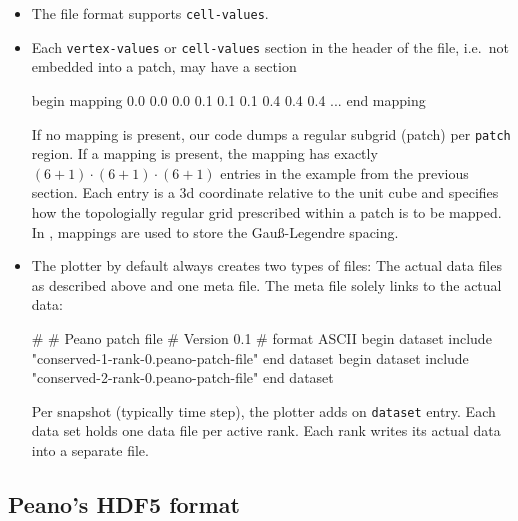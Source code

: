 \begin{itemize}
  \item The file format supports \texttt{cell-values}.
  \item Each \texttt{vertex-values} or \texttt{cell-values} section in the
  header of the file, i.e.~not embedded into a patch, may have a section
  \begin{code}
   begin mapping
     0.0 0.0 0.0
     0.1 0.1 0.1
     0.4 0.4 0.4
     ...
   end mapping
  \end{code} 
  If no mapping is present, our code dumps a regular subgrid (patch) per
  \texttt{patch} region. If a mapping is present, the mapping has exactly $(6+1)
  \cdot (6+1) \cdot (6+1)$ entries in the example from the previous section.
  Each entry is a 3d coordinate relative to the unit cube and specifies how the
  topologially regular grid prescribed within a patch is to be mapped. In
  \exahype, mappings are used to store the Gau\ss -Legendre spacing.
  \item The plotter by default always creates two types of files: The actual
  data files as described above and one meta file. The meta file solely links to
  the actual data:
  \begin{code}
# 
# Peano patch file 
# Version 0.1 
# 
format ASCII
begin dataset
  include "conserved-1-rank-0.peano-patch-file"
end dataset
begin dataset
  include "conserved-2-rank-0.peano-patch-file"
end dataset
  \end{code}
  Per snapshot (typically time step), the plotter adds on \texttt{dataset}
  entry. Each data set holds one data file per active rank. Each rank writes its
  actual data into a separate file. 
\end{itemize}


\subsection{Peano's HDF5 format}

